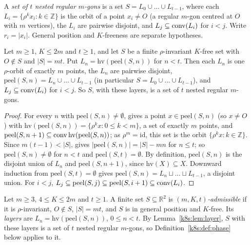 \begin{definition}\label{k8s:def:nested}
A \emph{set of $t$ nested regular $m$-gons} is a set $S=L_0\cup\dots\cup L_{t-1}$, where each $L_i=\{\rho^kx_i:k\in\mathbb Z\}$
is the orbit of a point $x_i\ne O$ (a regular $m$-gon centred at $O$ with $m$ vertices), the $L_i$ are pairwise
disjoint, and $L_j\subseteq\operatorname{conv}(L_i)$ for $i<j$. Write $r_i=|x_i|$. General position and $K$-freeness are separate
hypotheses.
\end{definition}

\begin{lemma}\label{k8s:lem:layer}
Let $m\ge1$, $K\le2m$ and $t\ge1$, and let $S$ be a finite $\rho$-invariant $K$-free set with $O\notin S$ and $|S|=mt$.
Put $L_n=\mathrm{hv}(\mathrm{peel}(S,n))$ for $n<t$. Then each $L_n$ is one $\rho$-orbit of exactly $m$ points, the $L_n$
are pairwise disjoint, $\mathrm{peel}(S,n)=L_n\cup\dots\cup L_{t-1}$ (in particular $S=L_0\cup\dots\cup L_{t-1}$), and
$L_j\subseteq\operatorname{conv}(L_i)$ for $i<j$. So $S$, with these layers, is a set of $t$ nested regular $m$-gons.
\end{lemma}

\begin{proof}
For every $n$ with $\mathrm{peel}(S,n)\ne\emptyset$,  gives a point $x\in\mathrm{peel}(S,n)$ (so
$x\ne O$) with $\mathrm{hv}(\mathrm{peel}(S,n))=\{\rho^kx:0\le k<m\}$, a set of exactly $m$ points, and
$\mathrm{peel}(S,n+1)\subseteq\operatorname{conv}\mathrm{hv}(\mathrm{peel}(S,n))$; as $\rho^m=\mathrm{id}$, this set is the orbit
$\{\rho^kx:k\in\mathbb Z\}$. Since $m(t-1)<|S|$,  gives $|\mathrm{peel}(S,n)|=|S|-mn$ for $n\le t$; so
$\mathrm{peel}(S,n)\ne\emptyset$ for $n<t$ and $\mathrm{peel}(S,t)=\emptyset$. By definition, $\mathrm{peel}(S,n)$ is the
disjoint union of $L_n$ and $\mathrm{peel}(S,n+1)$, since $\mathrm{hv}(X)\subseteq X$. Downward induction from
$\mathrm{peel}(S,t)=\emptyset$ gives $\mathrm{peel}(S,n)=L_n\sqcup\dots\sqcup L_{t-1}$, a disjoint union. For $i<j$,
$L_j\subseteq\mathrm{peel}(S,j)\subseteq\mathrm{peel}(S,i+1)\subseteq\operatorname{conv}(L_i)$.
\end{proof}

\begin{definition}\label{k8s:def:adm}
Let $m\ge3$, $4\le K\le2m$ and $t\ge1$. A finite set $S\subseteq\mathbb R^2$ is \emph{$(m,K,t)$-admissible} if it is
$\rho$-invariant, $O\notin S$, $|S|=mt$, and $S$ is in general position and $K$-free. Its \emph{layers} are
$L_n=\mathrm{hv}(\mathrm{peel}(S,n))$, $0\le n<t$. By Lemma~\ref{k8s:lem:layer}, $S$ with these layers is a set of $t$
nested regular $m$-gons, so Definition~\ref{k8s:def:phase} below applies to it.
\end{definition}

